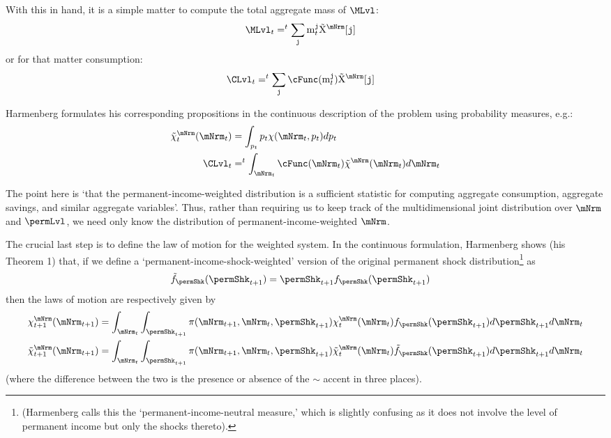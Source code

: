 \documentclass[\econtexRoot/BufferStockTheory]{subfiles}
\begin{document}
With this in hand, it is a simple matter to compute the total aggregate mass of $\MLvl$:
\begin{align}
  \MLvl_{t} & = \PermGroFac^{t} \sum_{\nmNrmVecNow} \mNrmVecNow \mpMatMargWgt[\nmNrmVecNow]
\end{align}
or for that matter consumption:
\begin{align}
  \CLvl_{t} & = \PermGroFac^{t} \sum_{\nmNrmVecNow} \cFunc(\mNrmVecNow) \mpMatMargWgt[\nmNrmVecNow]
\end{align}

Harmenberg formulates his corresponding propositions in the continuous description of the problem using probability measures, e.g.:
\begin{align}
  \mpPrbMargWgt_{t}(\mNrmNow) & = \int_{\permLvlNow} \permLvlNow \mpPrb(\mNrmNow,\permLvlNow) d \permLvlNow
\\ \CLvl_{t} & = \PermGroFac^{t} \int_{\mNrmNow} \cFunc(\mNrmNow) \mpPrbMargWgt(\mNrmNow)                             d \mNrmNow
\end{align}

The point here is `that the permanent-income-weighted distribution is a sufficient statistic for computing aggregate consumption, aggregate savings, and similar aggregate variables'.  Thus, rather than requiring us to keep track of the multidimensional joint distribution over $\mNrm$ and $\permLvl$, we need only know the distribution of permanent-income-weighted $\mNrm$.

The crucial last step is to define the law of motion for the weighted system.  In the continuous formulation, Harmenberg shows (his Theorem 1) that, if we define a `permanent-income-shock-weighted' version of the original permanent shock distribution\footnote{(Harmenberg calls this the `permanent-income-neutral measure,' which is slightly confusing as it does not involve the level of permanent income but only the shocks thereto).} as
\begin{align}
  \permShkWgtPrb(\permShkPrbNxt) & = \permShkPrbNxt \permShkRawPrb(\permShkPrbNxt)
\end{align}
then the laws of motion are respectively given by 
\begin{equation}\begin{aligned}
  \mpPrbMargRaw_{t+1}(\mNrmNxt) & = \int_{\mNrmNow} \int_{\permShkPrbNxt} \lomdkPrb(\mNrmNxt,\mNrmNow,\permShkPrbNxt) \mpPrbMargRaw_{t}(\mNrmNow) \permShkRawPrb(\permShkPrbNxt) d \permShkPrbNxt d \mNrmNow
  \\
  \mpPrbMargWgt_{t+1}(\mNrmNxt) & = \int_{\mNrmNow} \int_{\permShkPrbNxt} \lomdkPrb(\mNrmNxt,\mNrmNow,\permShkPrbNxt) \mpPrbMargWgt_{t}(\mNrmNow) \permShkWgtPrb(\permShkPrbNxt) d \permShkPrbNxt d \mNrmNow
\end{aligned}\end{equation}
(where the difference between the two is the presence or absence of the $\sim$ accent in three places).
\end{document}
